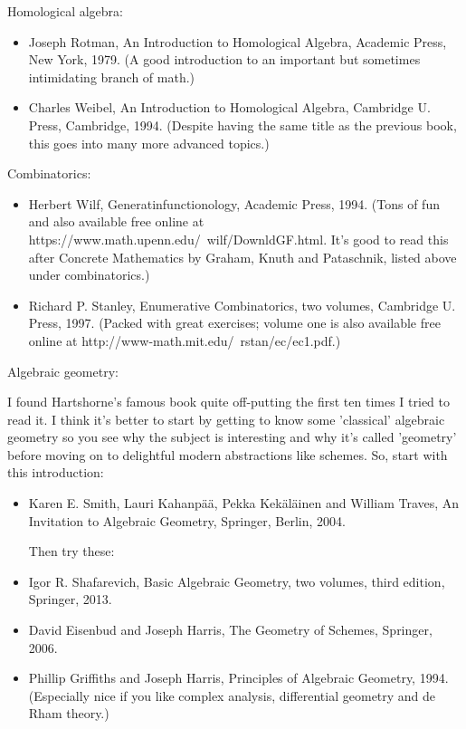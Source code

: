 \documentclass[10pt,a4paper]{book}
\theoremstyle{definition}
\begin{document}
Homological algebra:

\begin{itemize}
\item Joseph Rotman, An Introduction to Homological Algebra, Academic Press, New York, 1979. (A good introduction to an important but sometimes intimidating branch of math.)

\item Charles Weibel, An Introduction to Homological Algebra, Cambridge U. Press, Cambridge, 1994. (Despite having the same title as the previous book, this goes into many more advanced topics.)
\end{itemize}

Combinatorics:

\begin{itemize}
\item Herbert Wilf, Generatinfunctionology, Academic Press, 1994. (Tons of fun and also available free online at https://www.math.upenn.edu/~wilf/DownldGF.html. It's good to read this after Concrete Mathematics by Graham, Knuth and Pataschnik, listed above under combinatorics.)
\item Richard P. Stanley, Enumerative Combinatorics, two volumes, Cambridge U. Press, 1997. (Packed with great exercises; volume one is also available free online at http://www-math.mit.edu/~rstan/ec/ec1.pdf.)
\end{itemize}

Algebraic geometry:

I found Hartshorne's famous book quite off-putting the first ten times I tried to read it. I think it's better to start by getting to know some 'classical' algebraic geometry so you see why the subject is interesting and why it's called 'geometry' before moving on to delightful modern abstractions like schemes. So, start with this introduction:

\begin{itemize}
\item Karen E. Smith, Lauri Kahanpää, Pekka Kekäläinen and William Traves, An Invitation to Algebraic Geometry, Springer, Berlin, 2004.

Then try these:

\item Igor R. Shafarevich, Basic Algebraic Geometry, two volumes, third edition, Springer, 2013.
\item David Eisenbud and Joseph Harris, The Geometry of Schemes, Springer, 2006.
\item Phillip Griffiths and Joseph Harris, Principles of Algebraic Geometry, 1994. (Especially nice if you like complex analysis, differential geometry and de Rham theory.)
\end{itemize}
\end{document}
